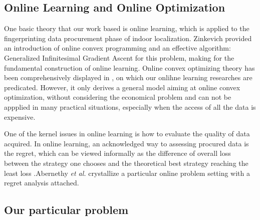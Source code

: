 \documentclass[10pt,conference,compsocconf,letterpaper]{IEEEtran}
\begin{document}
\subsection{Online Learning and Online Optimization}

One basic theory that our work based is online learning, which is applied to the fingerprinting data procurement phase of indoor localization. Zinkevich provided an introduction of online convex programming and an effective algorithm: Generalized Infinitesimal Gradient Ascent for this problem, making for the fundamental construction of online learning\cite{zinkevich2003online}.
Online convex optimizing theory has been comprehensively displayed in \cite{shalev2011online}, on which our onlihne learning researches are predicated. However, it only derives a general model aiming at online convex optimization, without considering the economical problem and can not be appplied in many practical situations, especially when the access of all the data is expensive. 

One of the kernel issues in online learning is how to evaluate the quality of data acquired. In online learning, an acknowledged way to assessing procured data is the regret, which can be viewed informally as the difference of overall loss between the strategy one chooses and the theoretical best strategy reaching the least loss \cite{shalev2011online}.Abernethy \emph{et al.} crystallize a particular online problem setting with a regret analysis attached\cite{abernethy2015low}. 

\subsection{Our particular problem}
\end{document}
